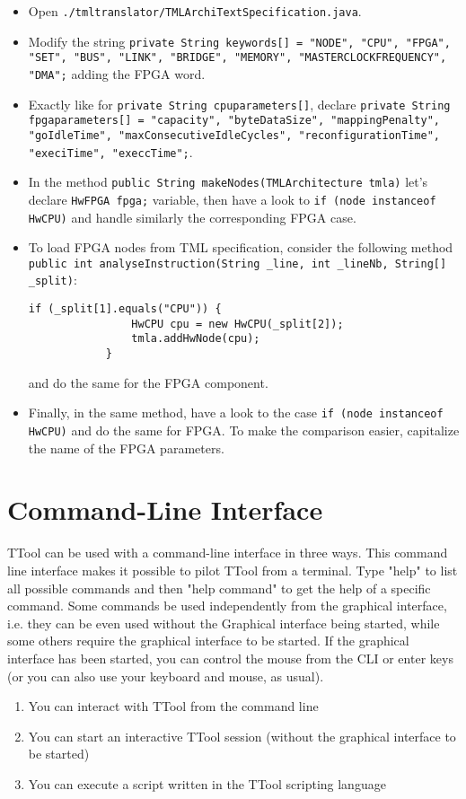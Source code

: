 \documentclass[12pt]{article}
\begin{document}
\begin{itemize}
\item Open \texttt{./tmltranslator/TMLArchiTextSpecification.java}.

\item Modify the string \texttt{private String keywords[] = {"NODE", "CPU", "FPGA", "SET", "BUS", "LINK", "BRIDGE", "MEMORY", "MASTERCLOCKFREQUENCY", "DMA"};} adding the FPGA word.

\item Exactly like for \texttt{private String cpuparameters[]}, declare \texttt{private String fpgaparameters[] = {"capacity", "byteDataSize", "mappingPenalty", "goIdleTime", "maxConsecutiveIdleCycles", "reconfigurationTime", "execiTime", "execcTime"};}. 

\item In the method \texttt{public String makeNodes(TMLArchitecture tmla)} let's declare \texttt{HwFPGA fpga;} variable, then have a look to \texttt{if (node instanceof HwCPU)} and handle similarly the corresponding FPGA case.

\item To load FPGA nodes from TML specification, consider the following method \texttt{public int analyseInstruction(String \_line, int \_lineNb, String[] \_split)}:
 \begin{lstlisting}
if (_split[1].equals("CPU")) {
                HwCPU cpu = new HwCPU(_split[2]);
                tmla.addHwNode(cpu);
            }
\end{lstlisting}
and do the same for the FPGA component.

\item Finally, in the same method, have a look to the case \texttt{if (node instanceof HwCPU)} and do the same for FPGA. To make the comparison easier, capitalize the name of the FPGA parameters. 
\end{itemize}   


\newpage
\section{Command-Line Interface}

TTool can be used with a command-line interface in three ways. This command line interface makes it possible to pilot TTool from a terminal. Type "help" to list all possible commands and then "help command" to get the help of a specific command. Some commands be used independently from the graphical interface, i.e. they can be even used without the Graphical interface being started, while some others require the graphical interface to be started. If the graphical interface has been started, you can control the mouse from the CLI or enter keys (or you can also use your keyboard and mouse, as usual).
\begin{enumerate}
\item You can interact with TTool from the command line 
\item You can start an interactive TTool session (without the graphical interface to be started)
\item You can execute a script written in the TTool scripting language
\end{enumerate}
\end{document}
